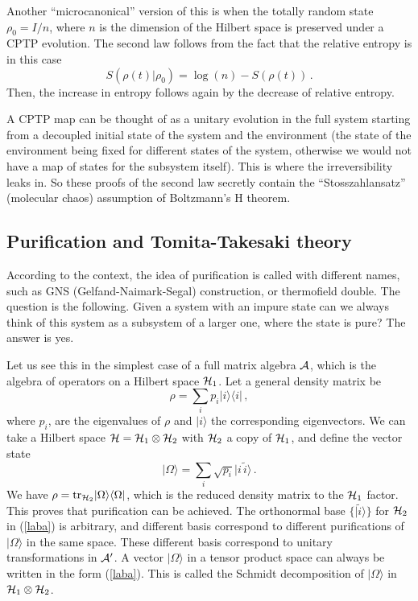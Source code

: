 \documentclass[11pt]{article}
\numberwithin{equation}{section}
\newcommand{\be}{\begin{equation}}
\newcommand{\ee}{\end{equation}}
\begin{document}
Another ``microcanonical'' version of this is
when the totally random state $\rho_0=I/n$, where $n$ is the dimension of the
Hilbert space is preserved under a CPTP evolution. 
 The second law follows from the fact that
the relative entropy is in this case
\begin{equation}
S(\rho(t)|\rho_0)=\log(n)-S(\rho(t))\,.
\end{equation}
Then, the increase in entropy follows again by the decrease of relative entropy.

A CPTP map can be thought of as a unitary evolution in the full system starting from a decoupled initial state of the system and the environment (the state of the environment being fixed for different states of the system, otherwise we would not have a map of states for the subsystem itself). This is where the irreversibility leaks in. So these proofs of the second law secretly contain the ``Stosszahlansatz'' (molecular chaos) assumption of Boltzmann's H theorem.     


\subsection{Purification and Tomita-Takesaki theory}
\label{tt}

According to the context, the idea of purification is called with different names, such as GNS (Gelfand-Naimark-Segal) construction, or thermofield double. The question is the following. Given a system with an impure state can we always think of this system as a subsystem of a larger one, where the state is pure? The answer is yes. 

Let us see this in the simplest case of a full matrix algebra ${\cal A}$, which is the algebra of operators on a Hilbert space ${\cal H}_1$. Let a general density matrix be 
\be
\rho=\sum_i p_i |i\rangle \langle i |\,,\label{dm}
\ee
 where $p_i$, are the eigenvalues of $\rho$ and $|i\rangle$ the corresponding eigenvectors. We can take a Hilbert space ${\cal H}={\cal H}_1\otimes {\cal H}_2$ with ${\cal H}_2$ a copy of ${\cal H}_1$, and define the vector state 
\begin{equation}
\vert \Omega \rangle = \sum_i \sqrt{p_i}  \vert i \,\tilde{i}\rangle\,.\label{laba}
\end{equation}
We have $\rho=\textrm{tr}_{{\cal H}_2}\vert \Omega\rangle \langle \Omega \vert$, which is the reduced density matrix to the ${\cal H}_1$ factor. This proves that purification can be achieved. 
The orthonormal base $\{\vert\tilde{i}\rangle\}$ for ${\cal H}_2$ in (\ref{laba}) is arbitrary, and different basis correspond to different purifications of $\vert \Omega \rangle$ in the same space. These different basis correspond to unitary transformations in ${\cal A}'$. A vector $\vert \Omega\rangle$ in a tensor product space can always be written in the form (\ref{laba}). This is called the Schmidt decomposition of $\vert \Omega \rangle$ in ${\cal H}_1\otimes {\cal H}_2$.
\end{document}
